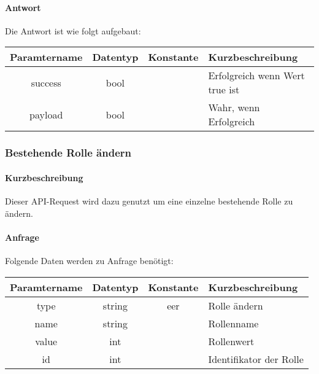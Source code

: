 \paragraph{Antwort}Die Antwort ist wie folgt aufgebaut:
\begin{table}[H]
	\begin{tabular}{|c|c|c|p{6.5cm}|}
		\hline
		\textbf{Paramtername} & \textbf{Datentyp} & \textbf{Konstante} & \textbf{Kurzbeschreibung}            \\ \hline                
		success             & bool             &                 & Erfolgreich wenn Wert {\glqq true\grqq} ist \\ \hline
		payload             & bool             &                 & Wahr, wenn Erfolgreich \\ \hline
	\end{tabular}
\end{table}
\subsubsection{Bestehende Rolle ändern}
\paragraph{Kurzbeschreibung}Dieser API-Request wird dazu genutzt um eine einzelne bestehende Rolle zu ändern.
\paragraph{Anfrage}Folgende Daten werden zu Anfrage benötigt:
\begin{table}[H]
	\begin{tabular}{|c|c|c|p{6.5cm}|}
		\hline
		\textbf{Paramtername} & \textbf{Datentyp} & \textbf{Konstante} & \textbf{Kurzbeschreibung}                                                                                               \\ \hline
		type                & string            & eer                & Rolle ändern \\ \hline
		name                & string            &                    & Rollenname \\ \hline
		value               & int               &                    & Rollenwert \\ \hline
		id                  & int               &                    & Identifikator der Rolle \\ \hline
	\end{tabular}
\end{table}
